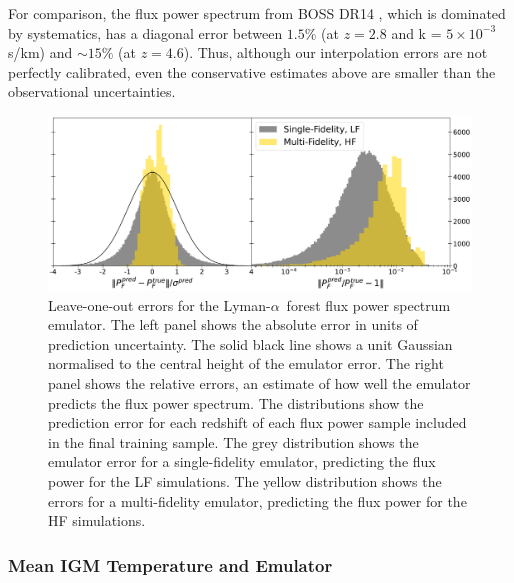 \documentclass[a4paper,11pt]{article}
\newcommand{\Lya}{Lyman-$\alpha$}
\begin{document}

For comparison, the flux power spectrum from BOSS DR14 \cite{Chabanier:2019}, which is dominated by systematics, has a diagonal error between $1.5\%$ (at $z=2.8$ and k = $5\times 10^{-3}$ s/km) and $\sim 15\%$ (at $z=4.6$). Thus, although our interpolation errors are not perfectly calibrated, even the conservative estimates above are smaller than the observational uncertainties.

\begin{figure}
    \centering
    \includegraphics[width=\textwidth]{figures/fpsemu_errors.pdf}
    \caption{\label{fig:fps_error}
    Leave-one-out errors for the \Lya~forest flux power spectrum emulator.
    The left panel shows the absolute error in units of prediction uncertainty. The solid black line shows a unit Gaussian normalised to the central height of the emulator error.
    The right panel shows the relative errors, an estimate of how well the emulator predicts the flux power spectrum.
    The distributions show the prediction error for each redshift of each flux power sample included in the final training sample.
    The grey distribution shows the emulator error for a single-fidelity emulator, predicting the flux power for the LF simulations.
    The yellow distribution shows the errors for a multi-fidelity emulator, predicting the flux power for the HF simulations.
    }
\end{figure}


\subsubsection{Mean IGM Temperature and Emulator}
\end{document}
